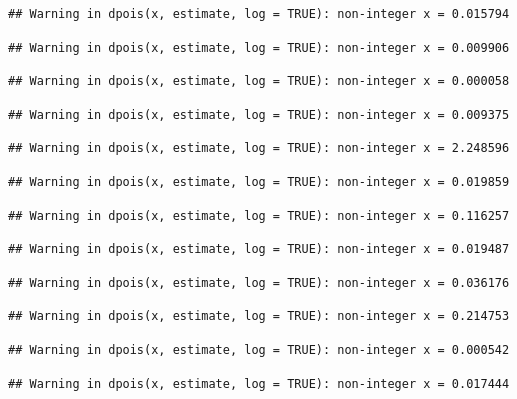\documentclass[]{article}
\begin{document}
\begin{verbatim}
## Warning in dpois(x, estimate, log = TRUE): non-integer x = 0.015794
\end{verbatim}

\begin{verbatim}
## Warning in dpois(x, estimate, log = TRUE): non-integer x = 0.009906
\end{verbatim}

\begin{verbatim}
## Warning in dpois(x, estimate, log = TRUE): non-integer x = 0.000058
\end{verbatim}

\begin{verbatim}
## Warning in dpois(x, estimate, log = TRUE): non-integer x = 0.009375
\end{verbatim}

\begin{verbatim}
## Warning in dpois(x, estimate, log = TRUE): non-integer x = 2.248596
\end{verbatim}

\begin{verbatim}
## Warning in dpois(x, estimate, log = TRUE): non-integer x = 0.019859
\end{verbatim}

\begin{verbatim}
## Warning in dpois(x, estimate, log = TRUE): non-integer x = 0.116257
\end{verbatim}

\begin{verbatim}
## Warning in dpois(x, estimate, log = TRUE): non-integer x = 0.019487
\end{verbatim}

\begin{verbatim}
## Warning in dpois(x, estimate, log = TRUE): non-integer x = 0.036176
\end{verbatim}

\begin{verbatim}
## Warning in dpois(x, estimate, log = TRUE): non-integer x = 0.214753
\end{verbatim}

\begin{verbatim}
## Warning in dpois(x, estimate, log = TRUE): non-integer x = 0.000542
\end{verbatim}

\begin{verbatim}
## Warning in dpois(x, estimate, log = TRUE): non-integer x = 0.017444
\end{verbatim}
\end{document}
